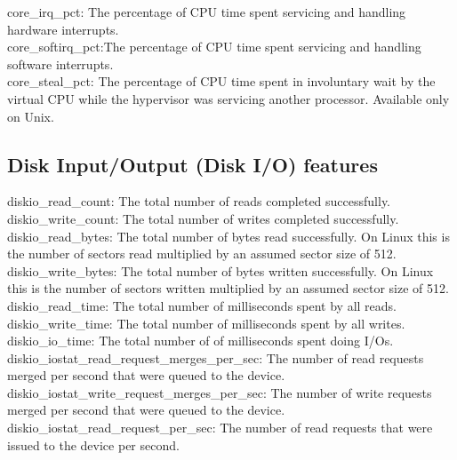 \documentclass{iosart2c}
\begin{document}
core\_irq\_pct: The percentage of CPU time spent servicing and handling hardware interrupts.\\

core\_softirq\_pct:The percentage of CPU time spent servicing and handling software interrupts.\\

core\_steal\_pct:  The percentage of CPU time spent in involuntary wait by the virtual CPU while the hypervisor was servicing another processor. Available only on Unix.


\subsection{Disk Input/Output (Disk I/O) features}

diskio\_read\_count: The total number of reads completed successfully.\\

diskio\_write\_count: The total number of writes completed successfully.\\

diskio\_read\_bytes: The total number of bytes read successfully. On Linux this is the number of sectors read multiplied by an assumed sector size of 512.\\

diskio\_write\_bytes: The total number of bytes written successfully. On Linux this is the number of sectors written multiplied by an assumed sector size of 512.\\

diskio\_read\_time: The total number of milliseconds spent by all reads.\\

diskio\_write\_time: The total number of milliseconds spent by all writes.\\

diskio\_io\_time: The total number of of milliseconds spent doing I/Os.\\

diskio\_iostat\_read\_request\_merges\_per\_sec: The number of read requests merged per second that were queued to the device.\\

diskio\_iostat\_write\_request\_merges\_per\_sec: The number of write requests merged per second that were queued to the device.\\

diskio\_iostat\_read\_request\_per\_sec: The number of read requests that were issued to the device per second.\\
\end{document}
